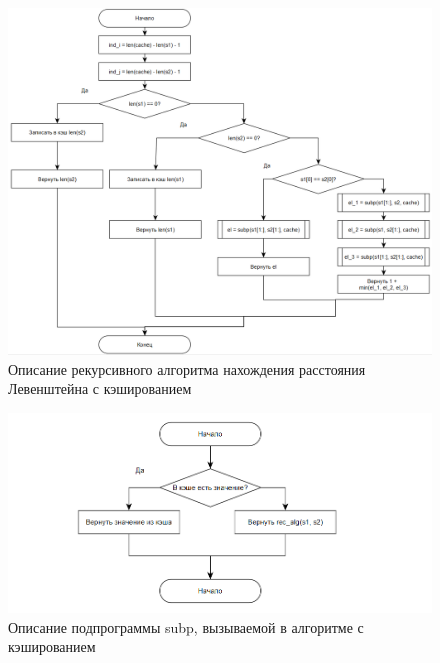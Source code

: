 \documentclass{article}
\begin{document}
\begin{figure}[h]
	\centering
	\includegraphics[scale=0.7]{tools/alg_2.png}
	\caption{Описание рекурсивного алгоритма нахождения расстояния Левенштейна с кэшированием}
	\label{fig:rec_lev_cache}
\end{figure}

\begin{figure}[h]
	\centering
	\includegraphics[scale=1.0]{tools/alg_2_subp.png}
	\caption{Описание подпрограммы subp, вызываемой в алгоритме с кэшированием}
	\label{fig:rec_lev_cache_subp}
\end{figure}
\end{document}
